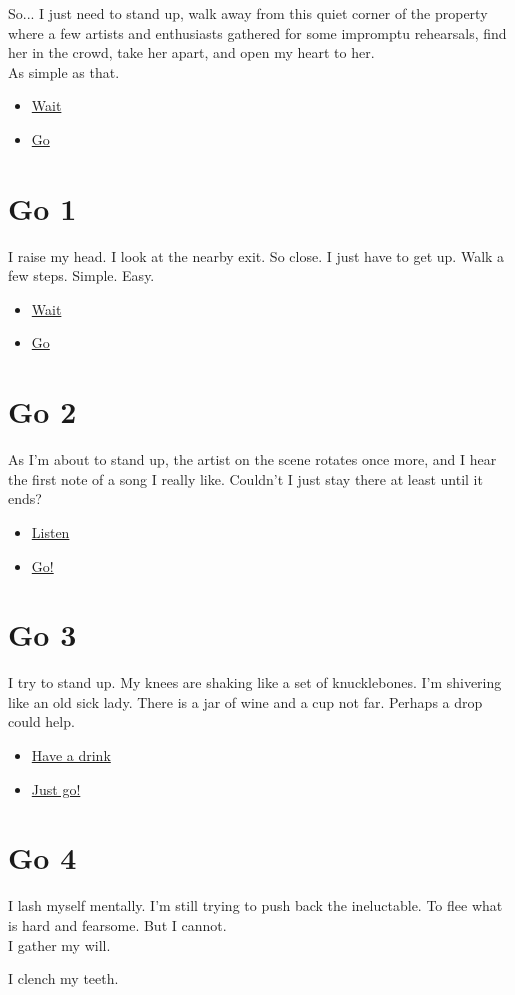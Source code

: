 \documentclass{report}
\newcommand{\glink}[2]{
	\hyperref[#1]{#2}
}
\newcommand{\gsection}[1]{
	\section*{#1}
	\label{#1}
}
\begin{document}
So... I just need to stand up, walk away from this quiet corner of the property where a few artists and enthusiasts gathered for some impromptu rehearsals, find her in the crowd, take her apart, and open my heart to her.\\

As simple as that.

\begin{itemize}
	\item \glink{Wait}{Wait}
	\item \glink{Go 1}{Go}
\end{itemize}

\gsection{Go 1}

I raise my head. I look at the nearby exit. So close. I just have to get up. Walk a few steps. Simple. Easy.

\begin{itemize}
	\item \glink{Wait}{Wait}
	\item \glink{Go 2}{Go}
\end{itemize}

\gsection{Go 2}

As I'm about to stand up, the artist on the scene rotates once more, and I hear the first note of a song I really like. Couldn't I just stay there at least until it ends?

\begin{itemize}
	\item \glink{Wait}{Listen}
	\item \glink{Go 3}{Go!}
\end{itemize}

\gsection{Go 3}

I try to stand up. My knees are shaking like a set of knucklebones. I'm shivering like an old sick lady. There is a jar of wine and a cup not far. Perhaps a drop could help.

\begin{itemize}
	\item \glink{Wait}{Have a drink}
	\item \glink{Go 3}{Just go!}
\end{itemize}

\gsection{Go 4}

I lash myself mentally. I'm still trying to push back the ineluctable. To flee what is hard and fearsome. But I cannot.\\

I gather my will.

I clench my teeth.
\end{document}
